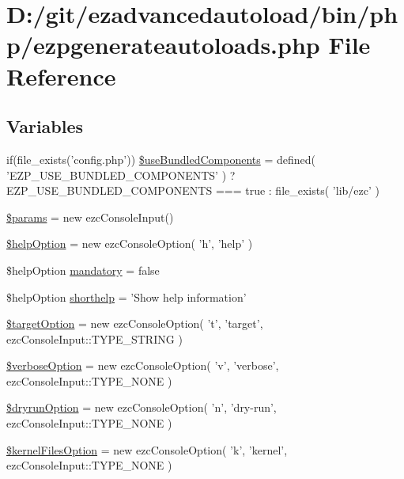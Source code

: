 \hypertarget{ezpgenerateautoloads_8php}{\section{\-D\-:/git/ezadvancedautoload/bin/php/ezpgenerateautoloads.php \-File \-Reference}
\label{ezpgenerateautoloads_8php}
}
\subsection*{\-Variables}
\begin{DoxyCompactItemize}
\item 
if(file\-\_\-exists('config.\-php')) \hyperlink{ezpgenerateautoloads_8php_abdb1c04b56bd870d8c95d438c1a3ceb7}{\$use\-Bundled\-Components} = defined( '\-E\-Z\-P\-\_\-\-U\-S\-E\-\_\-\-B\-U\-N\-D\-L\-E\-D\-\_\-\-C\-O\-M\-P\-O\-N\-E\-N\-T\-S' ) ? \-E\-Z\-P\-\_\-\-U\-S\-E\-\_\-\-B\-U\-N\-D\-L\-E\-D\-\_\-\-C\-O\-M\-P\-O\-N\-E\-N\-T\-S === true \-: file\-\_\-exists( 'lib/ezc' )
\item 
\hyperlink{ezpgenerateautoloads_8php_afe68e6fbe7acfbffc0af0c84a1996466}{\$params} = new ezc\-Console\-Input()
\item 
\hyperlink{ezpgenerateautoloads_8php_a785ce4531ef75b21040c99c8cbce7aa4}{\$help\-Option} = new ezc\-Console\-Option( 'h', 'help' )
\item 
\$help\-Option \hyperlink{ezpgenerateautoloads_8php_ac38115d855b4d48735ec865ab62bf1fe}{mandatory} = false
\item 
\$help\-Option \hyperlink{ezpgenerateautoloads_8php_a6878132bff242d248a03a92df0ead036}{shorthelp} = '\-Show help information'
\item 
\hyperlink{ezpgenerateautoloads_8php_a6b7b596c6eccab7f3c39bbcad2d711a0}{\$target\-Option} = new ezc\-Console\-Option( 't', 'target', ezc\-Console\-Input\-::\-T\-Y\-P\-E\-\_\-\-S\-T\-R\-I\-N\-G )
\item 
\hyperlink{ezpgenerateautoloads_8php_a22133d0c8998aa2d18623686cca5faa4}{\$verbose\-Option} = new ezc\-Console\-Option( 'v', 'verbose', ezc\-Console\-Input\-::\-T\-Y\-P\-E\-\_\-\-N\-O\-N\-E )
\item 
\hyperlink{ezpgenerateautoloads_8php_a2157a552be64e9a75918a23fef9e26e7}{\$dryrun\-Option} = new ezc\-Console\-Option( 'n', 'dry-\/run', ezc\-Console\-Input\-::\-T\-Y\-P\-E\-\_\-\-N\-O\-N\-E )
\item 
\hyperlink{ezpgenerateautoloads_8php_a7e74e8adf0bd544754962f4ddd4fc35b}{\$kernel\-Files\-Option} = new ezc\-Console\-Option( 'k', 'kernel', ezc\-Console\-Input\-::\-T\-Y\-P\-E\-\_\-\-N\-O\-N\-E )

\end{DoxyCompactItemize}
